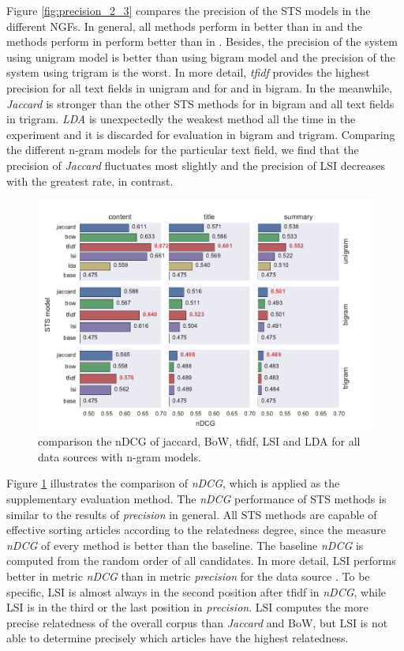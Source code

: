 Figure \ref{fig:precision_2_3} compares the precision of the STS models in the different NGFs. In general, all methods perform in \icontent{} better than in \ititle{} and the methods perform in \ititle{} perform better than in \isummary{}. Besides, the precision of the system using unigram model is better than using bigram model and the precision of the system using trigram is the worst. In more detail, \textit{tfidf} provides the highest precision for all text fields in unigram and for \icontent{} and \ititle{} in bigram. In the meanwhile, \textit{Jaccard} is stronger than the other STS methods for \isummary{} in bigram and all text fields in trigram. \textit{LDA} is unexpectedly the weakest method all the time in the experiment and it is discarded for evaluation in bigram and trigram. Comparing the different n-gram models for the particular text field, we find that the precision of \textit{Jaccard} fluctuates most slightly and the precision of LSI decreases with the greatest rate, in contrast. 

\begin{figure}[!htb]
    \centering
    \includegraphics[width=\textwidth]{fig/ndcg}
    \caption{comparison the nDCG of jaccard, BoW, tfidf, LSI and LDA for all data sources with n-gram models.}
    \label{fig:ndcg}
\end{figure}


Figure \ref{fig:ndcg} illustrates the comparison of \textit{nDCG}, which is applied as the supplementary evaluation method. The \textit{nDCG} performance of STS methods is similar to the results of \textit{precision} in general. All STS methods are capable of effective sorting articles according to the relatedness degree, since the measure \textit{nDCG} of every method is better than the baseline. The baseline \textit{nDCG} is computed from the random order of all candidates. In more detail, LSI performs better in metric \textit{nDCG} than in metric \textit{precision} for the data source \icontent{}. To be specific, LSI is almost always in the second position after tfidf in \textit{nDCG}, while LSI is in the third or the last position in \textit{precision}. LSI computes the more precise relatedness of the overall corpus than \textit{Jaccard} and BoW, but LSI is not able to determine precisely which articles have the highest relatedness. 


